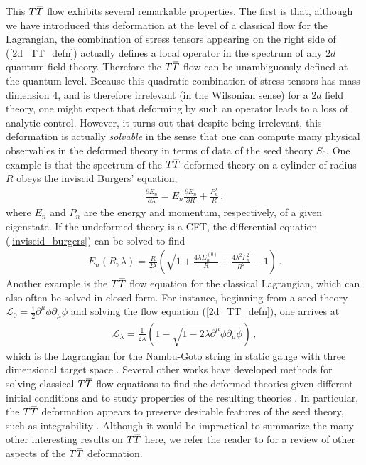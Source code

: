\documentclass[12pt]{article}
\numberwithin{equation}{section}
\newcommand{\overbar}[1]{\mkern 1.5mu\overline{\mkern-1.5mu#1\mkern-1.5mu}\mkern 1.5mu}
\def\TT{{T\overbar{T}}}
\begin{document}
This $\TT$ flow exhibits several remarkable properties. The first is that, although we have introduced this deformation at the level of a classical flow for the Lagrangian, the combination of stress tensors appearing on the right side of (\ref{2d_TT_defn}) actually defines a local operator in the spectrum of any $2d$ quantum field theory. Therefore the $\TT$ flow can be unambiguously defined at the quantum level. Because this quadratic combination of stress tensors has mass dimension $4$, and is therefore irrelevant (in the Wilsonian sense) for a $2d$ field theory, one might expect that deforming by such an operator leads to a loss of analytic control. However, it turns out that despite being irrelevant, this deformation is actually \emph{solvable} in the sense that one can compute many physical observables in the deformed theory in terms of data of the seed theory $S_0$. One example is that the spectrum of the $\TT$-deformed theory on a cylinder of radius $R$ obeys the inviscid Burgers' equation,
%
\begin{align}\label{inviscid_burgers}
    \frac{\partial E_n}{\partial \lambda} = E_n \frac{\partial E_n}{\partial R} + \frac{P_n^2}{R} \, , 
\end{align}
%
where $E_n$ and $P_n$ are the energy and momentum, respectively, of a given eigenstate. If the undeformed theory is a CFT, the differential equation (\ref{inviscid_burgers}) can be solved to find
%
\begin{align}
    E_n ( R , \lambda ) = \frac{R}{2 \lambda} \left( \sqrt{ 1 + \frac{4 \lambda E_n^{(0)} }{R} + \frac{4 \lambda^2 P_n^2}{R^2} } - 1  \right) \, .
\end{align}
%
Another example is the $\TT$ flow equation for the classical Lagrangian, which can also often be solved in closed form. For instance, beginning from a seed theory $\mathcal{L}_0 = \frac{1}{2} \partial^\mu \phi \partial_\mu \phi$ and solving the flow equation (\ref{2d_TT_defn}), one arrives at
%
\begin{align}\label{nambu_goto}
    \mathcal{L}_\lambda = \frac{1}{2 \lambda} \left( 1 - \sqrt{ 1 - 2 \lambda \partial^\mu \phi \partial_\mu \phi } \right) \, , 
\end{align}
%
which is the Lagrangian for the Nambu-Goto string in static gauge with three dimensional target space \cite{Cavaglia:2016oda}. Several other works have developed methods for solving classical $\TT$ flow equations to find the deformed theories given different initial conditions and to study properties of the resulting theories \cite{Bonelli:2018kik,Conti:2018tca,Frolov:2019nrr,Coleman:2019dvf,Frolov:2019xzi,Tolley:2019nmm, Sfondrini:2019smd,Jorjadze:2020ili,Brennan:2019azg,Ferko:2022dpg}. In particular, the $\TT$ deformation appears to preserve desirable features of the seed theory, such as integrability \cite{Smirnov:2016lqw,Chen:2021aid}. Although it would be impractical to summarize the many other interesting results on $\TT$ here, we refer the reader to \cite{Jiang:2019epa} for a review of other aspects of the $\TT$ deformation.
\end{document}
